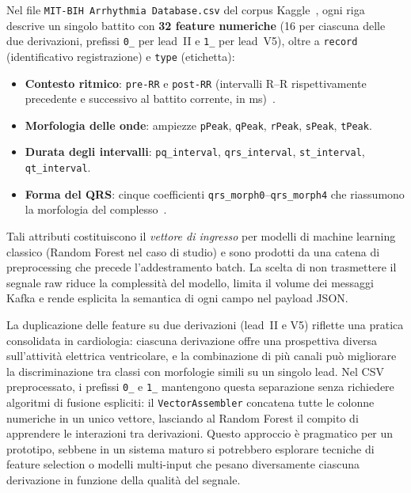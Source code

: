 Nel file \texttt{MIT-BIH Arrhythmia Database.csv} del corpus Kaggle~\cite{sakib2021kaggle,sakib2021edge}, ogni riga descrive un singolo battito con \textbf{32 feature numeriche} (16 per ciascuna delle due derivazioni, prefissi \texttt{0\_} per lead~II e \texttt{1\_} per lead~V5), oltre a \texttt{record} (identificativo registrazione) e \texttt{type} (etichetta):
\begin{itemize}
  \item \textbf{Contesto ritmico}: \texttt{pre-RR} e \texttt{post-RR} (intervalli R--R rispettivamente precedente e successivo al battito corrente, in ms)~\cite{dechazal2004automatic}.
  \item \textbf{Morfologia delle onde}: ampiezze \texttt{pPeak}, \texttt{qPeak}, \texttt{rPeak}, \texttt{sPeak}, \texttt{tPeak}.
  \item \textbf{Durata degli intervalli}: \texttt{pq\_interval}, \texttt{qrs\_interval}, \texttt{st\_interval}, \texttt{qt\_interval}.
  \item \textbf{Forma del QRS}: cinque coefficienti \texttt{qrs\_morph0}--\texttt{qrs\_morph4} che riassumono la morfologia del complesso~\cite{clifford2006advanced}.
\end{itemize}

Tali attributi costituiscono il \emph{vettore di ingresso} per modelli di machine learning classico (Random Forest nel caso di studio) e sono prodotti da una catena di preprocessing che precede l'addestramento batch.
La scelta di non trasmettere il segnale raw riduce la complessità del modello, limita il volume dei messaggi Kafka e rende esplicita la semantica di ogni campo nel payload JSON.

La duplicazione delle feature su due derivazioni (lead~II e V5) riflette una pratica consolidata in cardiologia: ciascuna derivazione offre una prospettiva diversa sull'attività elettrica ventricolare, e la combinazione di più canali può migliorare la discriminazione tra classi con morfologie simili su un singolo lead.
Nel CSV preprocessato, i prefissi \texttt{0\_} e \texttt{1\_} mantengono questa separazione senza richiedere algoritmi di fusione espliciti: il \texttt{VectorAssembler} concatena tutte le colonne numeriche in un unico vettore, lasciando al Random Forest il compito di apprendere le interazioni tra derivazioni.
Questo approccio è pragmatico per un prototipo, sebbene in un sistema maturo si potrebbero esplorare tecniche di feature selection o modelli multi-input che pesano diversamente ciascuna derivazione in funzione della qualità del segnale.

